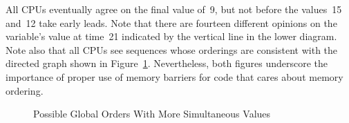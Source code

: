 All CPUs eventually agree on the final value of~9, but not before
the values~15 and~12 take early leads.
Note that there are fourteen different opinions on the variable's value
at time~21 indicated by the vertical line in the lower diagram.
Note also that all CPUs see sequences whose orderings are consistent with
the directed graph shown in
Figure~\ref{fig:advsync:Possible Global Orders With More Simultaneous Values}.
Nevertheless, both figures underscore the importance of
proper use of memory barriers for code that cares about memory ordering.
\fi

\begin{figure}[htb]
\centering
{}
\caption{Possible Global Orders With More Simultaneous Values}
\label{fig:advsync:Possible Global Orders With More Simultaneous Values}
\end{figure}

